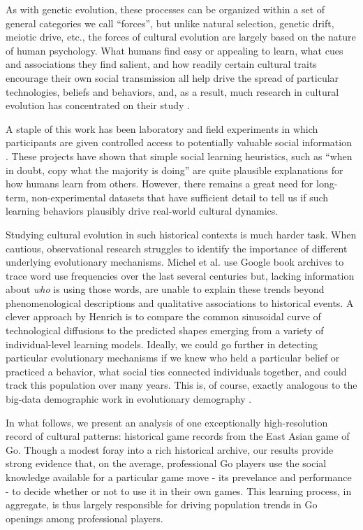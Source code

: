 As with genetic evolution, these processes can be organized within a set of general categories we call ``forces'', but unlike natural selection, genetic drift, meiotic drive, etc., the forces of cultural evolution are largely based on the nature of human psychology.  What humans find easy or appealing to learn, what cues and associations they find salient, and how readily certain cultural traits encourage their own social transmission all help drive the spread of particular technologies, beliefs and behaviors, and, as a result, much research in cultural evolution has concentrated on their study \citep{Richerson2005:NBGA}. 

A staple of this work has been laboratory and field experiments in which participants are given controlled access to potentially valuable social information \citep{caldwell2008studying, baum2004cultural, Mesoudi2011a, effersontakezawa2007}.  These projects have shown that simple social learning heuristics, such as ``when in doubt, copy what the majority is doing'' are quite plausible explanations for how humans learn from others.  However, there remains a great need for long-term, non-experimental datasets that have sufficient detail to tell us if such learning behaviors plausibly drive real-world cultural dynamics.  

Studying cultural evolution in such historical contexts is much harder task.  When cautious, observational research struggles to identify the importance of different underlying evolutionary mechanisms.  Michel et al. \citeyearpar{michel2011quantitative} use Google book archives to trace word use frequencies over the last several centuries but, lacking information about \textit{who} is using those words, are unable to explain these trends beyond phenomenological descriptions and qualitative associations to historical events.  A clever approach by Henrich \citeyearpar{Henrich2001} is to compare the common sinusoidal curve of technological diffusions to the predicted shapes emerging from a variety of individual-level learning models.  Ideally, we could go further in detecting particular evolutionary mechanisms if we knew who held a particular belief or practiced a behavior, what social ties connected individuals together, and could track this population over many years.  This is, of course, exactly analogous to the big-data demographic work in evolutionary demography \citep{grant2002unpredictable, ozgul2009dynamics}.  

In what follows, we present an analysis of one exceptionally high-resolution record of cultural patterns: historical game records from the East Asian game of Go.  Though a modest foray into a rich historical archive, our results provide strong evidence that, on the average, professional Go players use the social knowledge available for a particular game move - its prevelance and performance - to decide whether or not to use it in their own games.  This learning process, in aggregate, is thus largely responsible for driving population trends in Go openings among professional players.


